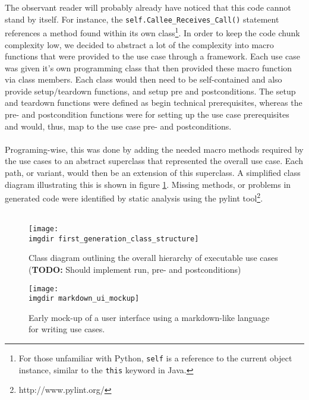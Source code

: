 \noindent
The observant reader will probably already have noticed that this code cannot stand by itself. For instance, the \texttt{self.Callee\_Receives\_Call()} statement references a method found within its own class\footnote{For those unfamiliar with Python, \texttt{self} is a reference to the current object instance, similar to the \texttt{this} keyword in Java.}. In order to keep the code chunk complexity low, we decided to abstract a lot of the complexity into macro functions that were provided to the use case through a framework. Each use case was given it's own programming class that then provided these macro function via class members. Each class would then need to be self-contained and also provide setup/teardown functions, and setup pre and postconditions. The setup and teardown functions were defined as begin technical prerequisites, whereas the pre- and postcondition functions were for setting up the use case prerequisites and would, thus, map to the use case pre- and postconditions.\\\\
Programing-wise, this was done by adding the needed macro methods required by the use cases to an abstract superclass that represented the overall use case. Each path, or variant, would then be an extension of this superclass. A simplified class diagram illustrating this is shown in figure \ref{fig:first_generation_class_structure}. Missing methods, or problems in generated code were identified by static analysis using the pylint tool\footnote{http://www.pylint.org/}.\\\\


\begin{figure}[!h]
\centering
\texttt{[image: \\imgdir first\_generation\_class\_structure]}
\caption{Class diagram outlining the overall hierarchy of executable use cases (\textbf{TODO:} Should implement run, pre- and postconditions)}
\label{fig:first_generation_class_structure}
\end{figure}

\begin{figure}
\centering
\texttt{[image: \\imgdir markdown\_ui\_mockup]}
\caption{Early mock-up of a user interface using a markdown-like language for writing use cases.}
\label{fig:markdown_ui_mockup}
\end{figure}


